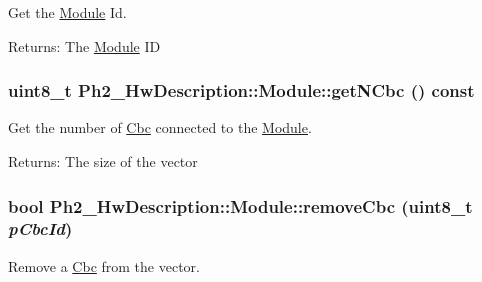 Get the \hyperlink{class_ph2___hw_description_1_1_module}{Module} Id. 

\begin{Desc}
\item[Returns:]The \hyperlink{class_ph2___hw_description_1_1_module}{Module} ID \end{Desc}
\hypertarget{class_ph2___hw_description_1_1_module_e7fd58a25f6934dcb28ff5472ae69aff}{
\subsubsection[getNCbc]{\setlength{\rightskip}{0pt plus 5cm}uint8\_\-t Ph2\_\-Hw\-Description::Module::get\-NCbc () const}}
\label{class_ph2___hw_description_1_1_module_e7fd58a25f6934dcb28ff5472ae69aff}


Get the number of \hyperlink{class_ph2___hw_description_1_1_cbc}{Cbc} connected to the \hyperlink{class_ph2___hw_description_1_1_module}{Module}. 

\begin{Desc}
\item[Returns:]The size of the vector \end{Desc}
\hypertarget{class_ph2___hw_description_1_1_module_0aa7c940311bd13a32fd4e0f251c2d27}{
\subsubsection[removeCbc]{\setlength{\rightskip}{0pt plus 5cm}bool Ph2\_\-Hw\-Description::Module::remove\-Cbc (uint8\_\-t {\em p\-Cbc\-Id})}}
\label{class_ph2___hw_description_1_1_module_0aa7c940311bd13a32fd4e0f251c2d27}


Remove a \hyperlink{class_ph2___hw_description_1_1_cbc}{Cbc} from the vector. 

